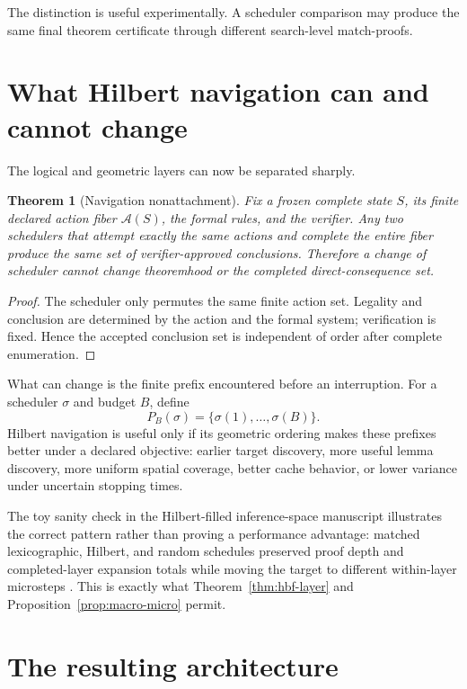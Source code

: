 \documentclass[11pt]{article}
\newtheorem{theorem}{Theorem}[section]
\theoremstyle{definition}
\begin{document}
The distinction is useful experimentally. A scheduler comparison may produce the same final theorem certificate through different search-level match-proofs.

\section{What Hilbert navigation can and cannot change}

The logical and geometric layers can now be separated sharply.

\begin{theorem}[Navigation nonattachment]\label{thm:nonattachment}
Fix a frozen complete state $S$, its finite declared action fiber $\mathcal A(S)$, the formal rules, and the verifier. Any two schedulers that attempt exactly the same actions and complete the entire fiber produce the same set of verifier-approved conclusions. Therefore a change of scheduler cannot change theoremhood or the completed direct-consequence set.
\end{theorem}

\begin{proof}
The scheduler only permutes the same finite action set. Legality and conclusion are determined by the action and the formal system; verification is fixed. Hence the accepted conclusion set is independent of order after complete enumeration.
\end{proof}

What can change is the finite prefix encountered before an interruption. For a scheduler $\sigma$ and budget $B$, define
\[
P_B(\sigma)=\{\sigma(1),\ldots,\sigma(B)\}.
\]
Hilbert navigation is useful only if its geometric ordering makes these prefixes better under a declared objective: earlier target discovery, more useful lemma discovery, more uniform spatial coverage, better cache behavior, or lower variance under uncertain stopping times.

The toy sanity check in the Hilbert-filled inference-space manuscript illustrates the correct pattern rather than proving a performance advantage: matched lexicographic, Hilbert, and random schedules preserved proof depth and completed-layer expansion totals while moving the target to different within-layer microsteps \cite{TennesonHilbertFilled03}. This is exactly what Theorem~\ref{thm:hbf-layer} and Proposition~\ref{prop:macro-micro} permit.

\section{The resulting architecture}
\end{document}
